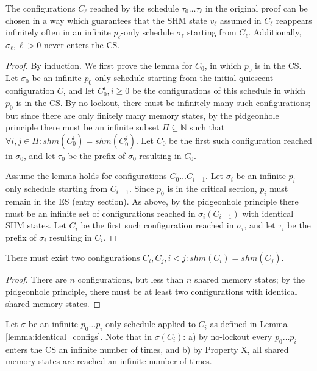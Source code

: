 \begin{lemma} \label{lemma:p_i_only}
The configurations $C_\ell$ reached by the schedule $\tau_0 \ldots \tau_\ell$
in the original proof can be chosen in a way which guarantees that the SHM
state $v_\ell$ assumed in $C_\ell$ reappears infinitely often in an infinite
$p_\ell$-only schedule $\sigma_\ell$ starting from $C_\ell$. Additionally,
$\sigma_\ell, \ell > 0$ never enters the CS.
\end{lemma}

\begin{proof}
By induction.
We first prove the lemma for $C_0$, in which $p_0$ is in the CS. Let $\sigma_0$
be an infinite $p_0$-only schedule starting from the initial quiescent configuration
$C$, and let $C_0^i, i \geq 0$ be the configurations of this schedule in which
$p_0$ is in the CS. By no-lockout, there must be infinitely many such configurations;
but since there are only finitely many memory states, by the pidgeonhole principle
there must be an infinite subset $\Pi \subseteq \mathbb{N}$ such that 
$\forall i, j \in \Pi: shm(C_0^i) = shm(C_0^j)$. Let $C_0$ be the first such
configuration reached in $\sigma_0$, and let $\tau_0$ be the prefix of
$\sigma_0$ resulting in $C_0$.

Assume the lemma holds for configurations $C_0 \ldots C_{i-1}$.
Let $\sigma_i$ be an infinite $p_i$-only schedule starting from $C_{i-1}$.
Since $p_0$ is in the critical section, $p_i$ must remain in the ES (entry
section). As above, by the pidgeonhole principle there must be an infinite
set of configurations reached in $\sigma_i(C_{i-1})$ with identical SHM
states. Let $C_i$ be the first such configuration reached in $\sigma_i$,
and let $\tau_i$ be the prefix of $\sigma_i$ resulting in $C_i$.
\end{proof}

\begin{lemma} \label{lemma:identical_configs}
There must exist two configurations $C_i, C_j, i < j: shm(C_i) = shm(C_j)$.
\end{lemma}

\begin{proof}
There are $n$ configurations, but less than $n$ shared memory states; by the
pidgeonhole principle, there must be at least two configurations with identical
shared memory states.
\end{proof}

\begin{definition} \label{def:sigma}
Let $\sigma$ be an infinite $p_0 \ldots p_i$-only schedule applied to $C_i$
as defined in Lemma \ref{lemma:identical_configs}. Note that in $\sigma(C_i)$: 
a) by no-lockout every $p_0 \ldots p_i$ enters the CS an infinite number of times,
and b) by Property X, all shared memory states are 
reached an infinite number of times.
\end{definition}


